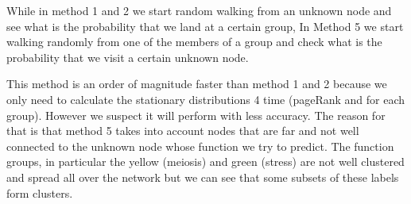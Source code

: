 \begin{itemize}
While in method 1 and 2 we start random walking from an unknown node and see
what is the probability that we land at a certain group, In Method 5 we start
walking randomly from one of the members of a group and check what is the
probability that we visit a certain unknown node.

This method is an order of magnitude faster than method 1 and 2 because we only
need to calculate the stationary distributions 4 time (pageRank and for each
group). However we suspect it will perform with less accuracy.
The reason for that is that method 5 takes into account nodes that are far and not well connected to the
unknown node whose function we try to predict.
The function groups, in particular the yellow (meiosis) and green (stress) are not
well clustered and spread all over the network but we can see that
some subsets of these labels form clusters.

\end{itemize}


